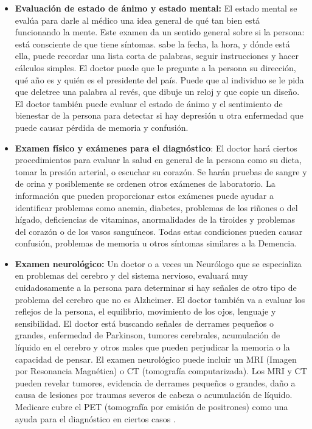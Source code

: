 \begin{itemize}
	\item \textbf{Evaluación de estado de ánimo y estado mental:} El estado mental se evalúa para darle al médico una idea general de qué tan bien está funcionando la mente. Este examen da un sentido general sobre si la persona: está consciente de que tiene síntomas. sabe la fecha, la hora, y dónde está ella, puede recordar una lista corta de palabras, seguir instrucciones y hacer cálculos simples. El doctor puede que le pregunte a la persona su dirección, qué año es y quién es el presidente del país. Puede que al individuo se le pida que deletree una palabra al revés, que dibuje un reloj y que copie un diseño. El doctor también puede evaluar el estado de ánimo y el sentimiento de bienestar de la persona para detectar si hay depresión u otra enfermedad que puede causar pérdida de memoria y confusión.
	\item \textbf{Examen físico y exámenes para el diagnóstico}: El doctor hará ciertos procedimientos para evaluar la salud en general de la persona como su dieta, tomar la presión arterial, o escuchar su corazón. Se harán pruebas de sangre y de orina y posiblemente se ordenen otros exámenes de laboratorio. La información que pueden proporcionar estos exámenes puede ayudar a identificar problemas como anemia, diabetes, problemas de los riñones o del hígado, deficiencias de vitaminas, anormalidades de la tiroides y problemas del corazón o de los vasos sanguíneos. Todas estas condiciones pueden causar confusión, problemas de memoria u otros síntomas similares a la Demencia.
	\item \textbf{Examen neurológico:} Un doctor o a veces un Neurólogo que se especializa en problemas del cerebro y del sistema nervioso, evaluará muy cuidadosamente a la persona para determinar si hay señales de otro tipo de problema del cerebro que no es Alzheimer. El doctor también va a evaluar los reflejos de la persona, el equilibrio, movimiento de los ojos, lenguaje y sensibilidad. El doctor está buscando señales de derrames pequeños o grandes, enfermedad de Parkinson, tumores cerebrales, acumulación de líquido en el cerebro y otros males que pueden perjudicar la memoria o la capacidad de pensar. El examen neurológico puede incluir un MRI (Imagen por Resonancia Magnética) o CT (tomografía computarizada). Los MRI y CT pueden revelar tumores, evidencia de derrames pequeños o grandes, daño a causa de lesiones por traumas severos de cabeza o acumulación de líquido. Medicare cubre el PET (tomografía por emisión de positrones) como una ayuda para el diagnóstico en ciertos casos .
\end{itemize}
